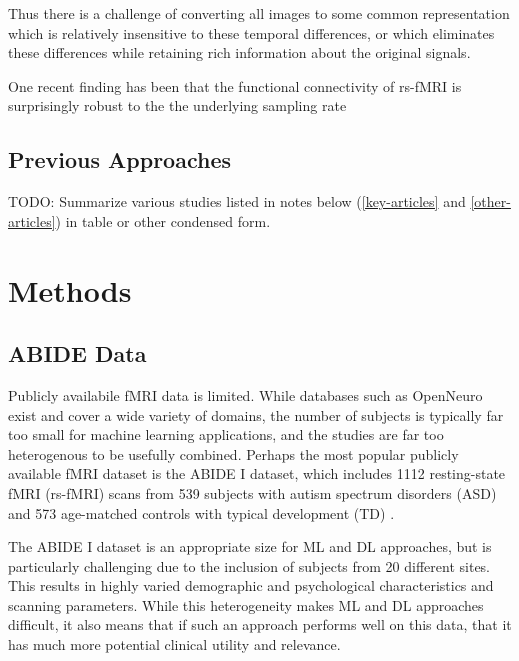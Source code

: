 \documentclass[10pt]{article}
\begin{document}
Thus there is a challenge of converting all images to some common representation which is relatively
insensitive to these temporal differences, or which eliminates these differences while retaining
rich information about the original signals.

One recent finding has been that the functional connectivity of rs-fMRI is surprisingly robust to the
the underlying sampling rate \citep{huotariSamplingRateEffects2019,shakilEvaluationSlidingWindow2016}

\subsection{Previous Approaches}

TODO: Summarize various studies listed in notes below (\ref{key-articles} and \ref{other-articles})
in table or other condensed form.



\section{Methods}

\subsection{ABIDE Data}

Publicly availabile fMRI data is limited. While databases such as OpenNeuro
\citep{markiewiczOpenNeuroOpenResource2021} exist and cover a wide variety of domains, the number
of subjects is typically far too small for machine learning applications, and the studies are far
too heterogenous to be usefully combined. Perhaps the most popular publicly available fMRI dataset
is the ABIDE I dataset, which includes 1112 resting-state fMRI (rs-fMRI) scans from 539 subjects
with autism spectrum disorders (ASD) and 573 age-matched controls with typical development (TD)
\citep{dimartinoAutismBrainImaging2014}.

The ABIDE I dataset is an appropriate size for ML and DL approaches, but is particularly challenging
due to the inclusion of subjects from 20 different sites. This results in highly varied demographic
and psychological characteristics and scanning parameters. While this heterogeneity makes ML and DL
approaches difficult, it also means that if such an approach performs well on this data, that it has
much more potential clinical utility and relevance.
\end{document}
